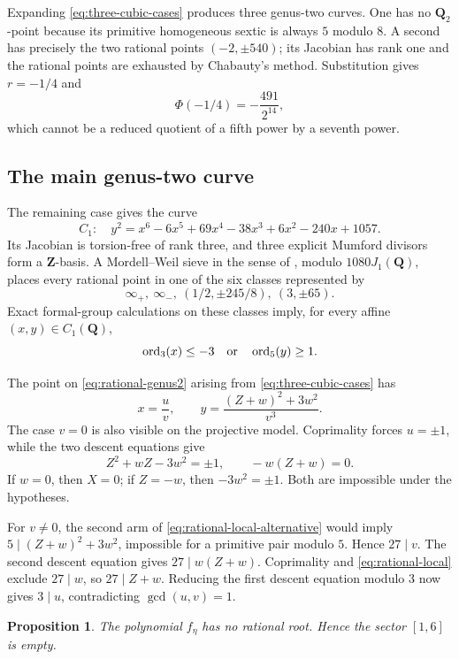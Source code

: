 \documentclass[11pt]{article}
\newcommand{\Q}{\mathbf Q}
\newcommand{\Z}{\mathbf Z}
\newcommand{\ord}{\operatorname{ord}}
\newtheorem{proposition}[theorem]{Proposition}
\theoremstyle{definition}
\theoremstyle{remark}
\begin{document}
Expanding \eqref{eq:three-cubic-cases} produces three genus-two curves.
One has no $\Q_2$-point because its primitive homogeneous sextic is always
$5$ modulo $8$.  A second has precisely the two rational points
$(-2,\pm540)$; its Jacobian has rank one and the rational points are
exhausted by Chabauty's method.  Substitution gives $r=-1/4$ and
\[
                         \Phi(-1/4)=-\frac{491}{2^{14}},
\]
which cannot be a reduced quotient of a fifth power by a seventh power.

\subsection{The main genus-two curve}

The remaining case gives the curve
\begin{equation}\label{eq:rational-genus2}
 C_1:\quad
 y^2=x^6-6x^5+69x^4-38x^3+6x^2-240x+1057.
\end{equation}
Its Jacobian is torsion-free of rank three, and three explicit Mumford
divisors form a $\Z$-basis.  A Mordell--Weil sieve in the sense of
\cite{BruinStollSieve}, modulo $1080J_1(\Q)$,
places every rational point in one of the six classes represented by
\[
 \infty_+,\ \infty_-,\ (1/2,\pm245/8),\ (3,\pm65).
\]
Exact formal-group calculations on these classes imply, for every affine
$(x,y)\in C_1(\Q)$,
\begin{equation}\label{eq:rational-local-alternative}
                         \ord_3(x)\leq-3
                    \quad\hbox{or}\quad
                         \ord_5(y)\geq1.
\end{equation}

The point on \eqref{eq:rational-genus2} arising from
\eqref{eq:three-cubic-cases} has
\[
 x=\frac uv,\qquad
 y=\frac{(Z+w)^2+3w^2}{v^3}.
\]
The case $v=0$ is also visible on the projective model.  Coprimality forces
$u=\pm1$, while the two descent equations give
\[
       Z^2+wZ-3w^2=\pm1,\qquad -w(Z+w)=0.
\]
If $w=0$, then $X=0$; if $Z=-w$, then $-3w^2=\pm1$.  Both are impossible
under the hypotheses.

For $v\neq0$, the second arm of
\eqref{eq:rational-local-alternative} would imply
$5\mid (Z+w)^2+3w^2$, impossible for a primitive pair modulo $5$.
Hence $27\mid v$.  The second descent equation gives
$27\mid w(Z+w)$.  Coprimality and \eqref{eq:rational-local} exclude
$27\mid w$, so $27\mid Z+w$.  Reducing the first descent equation modulo
$3$ now gives $3\mid u$, contradicting $\gcd(u,v)=1$.

\begin{proposition}\label{prop:rational-sector}
The polynomial $f_\eta$ has no rational root.  Hence the sector $[1,6]$
is empty.
\end{proposition}
\end{document}
